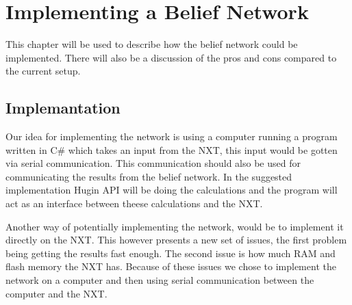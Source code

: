 \chapter{Implementing a Belief Network}
This chapter will be used to describe how the belief network could be
implemented. There will also be a discussion of the pros and cons compared to
the current setup. 

\section{Implemantation}
Our idea for implementing the network is using a computer running a program
written in C\# which takes an input from the NXT, this input would be gotten
via serial communication. This communication should also be used for
communicating the results from the belief network. In the suggested
implementation Hugin API will be doing the calculations and the program will act
as an interface between theese calculations and the NXT. \nl

Another way of potentially implementing the network, would be to implement it
directly on the NXT. This however presents a new set of issues, the first
problem being getting the results fast enough. The second issue is how much RAM
and flash memory the NXT has. Because of these issues we chose to implement the
network on a computer and then using serial communication between the computer
and the NXT.
